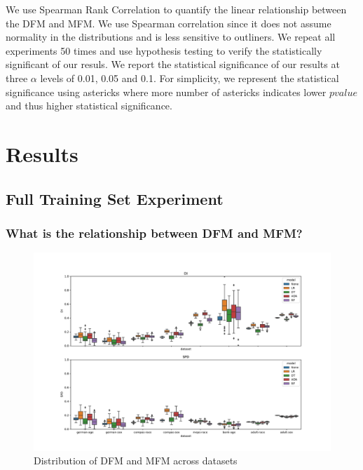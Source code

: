 \documentclass{article}
\begin{document}
We use Spearman Rank Correlation to quantify the linear relationship
between the DFM and MFM. We use Spearman correlation since it does not
assume normality in the distributions and is less sensitive to
outliners. We repeat all experiments 50 times and use hypothesis
testing to verify the statistically significant of our resuls. We
report the statistical significance of our results at three $\alpha$
levels of 0.01, 0.05 and 0.1. For simplicity, we represent the
statistical significance using astericks where more number of
astericks indicates lower $pvalue$ and thus higher statistical
significance.


\section{Results}\label{sec:results}

\subsection{Full Training Set Experiment}\label{sec:results-full}

\subsubsection{What is the relationship between DFM and MFM?}\label{sec:results-full-rel}

\begin{figure}
  \centering
  \includegraphics[width=0.95\linewidth]{boxplot--dataset--di-spd--exp-full.pdf}
  \caption{Distribution of DFM and MFM across datasets}
  \label{fig:boxplot--dataset--di-spd--exp-full}
\end{figure}
\end{document}
